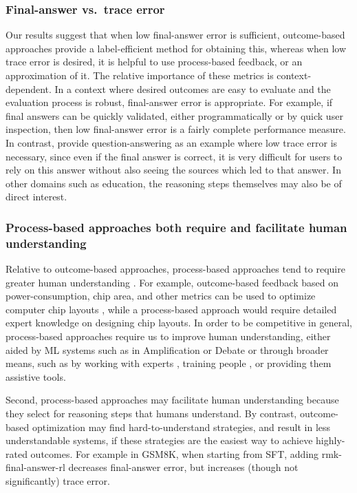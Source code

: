 \documentclass[11pt, a4paper, logo]{deepmind}
\newcommand{\Short}[1]{\csname rmk-#1\endcsname}
\newcommand{\finalanswerrl}{\Short{final-answer-rl}}
\begin{document}
{\subsubsection{Final-answer vs.\ trace error}
\label{subsec:final_answer_trace_error}
Our results suggest that when low final-answer error is sufficient, outcome-based approaches provide a label-efficient method for obtaining this, whereas when low trace error is desired, it is helpful to use process-based feedback, or an approximation of it.
The relative importance of these metrics is context-dependent.
In a context where desired outcomes are easy to evaluate and the evaluation process is robust, final-answer error is appropriate.
For example, if final answers can be quickly validated, either programmatically or by quick user inspection, then low final-answer error is a fairly complete performance measure. In contrast, \citet{menick2022teaching} provide question-answering as an example where low trace error is necessary, since even if the final answer is correct, it is very difficult for users to rely on this answer without also seeing the sources which led to that answer.
In other domains such as education, the reasoning steps themselves may also be of direct interest.







\subsubsection{Process-based approaches both require and facilitate human understanding}
Relative to outcome-based approaches, process-based approaches tend to require greater human understanding \citep{krakovna2020specification}.
For example, outcome-based feedback based on power-consumption, chip area, and other metrics can be used to optimize computer chip layouts \citep{mirhoseini2021graph}, while a process-based approach would require detailed expert knowledge on designing chip layouts.
In order to be competitive in general, process-based approaches require us to improve human understanding, either aided by ML systems such as in Amplification or Debate \citep{christiano2018supervising, irving2018ai} or through broader means, such as by working with experts \citep{rauh2022characteristics}, training people \citep{stiennon2020learning}, or providing them assistive tools.

Second, process-based approaches may facilitate human understanding because they select for reasoning steps that humans understand.
By contrast, outcome-based optimization may find hard-to-understand strategies, and result in less understandable systems, if these strategies are the easiest way to achieve highly-rated outcomes.
For example in GSM8K, when starting from SFT, adding \finalanswerrl{} decreases final-answer error, but increases (though not significantly) trace error.


}
\end{document}
